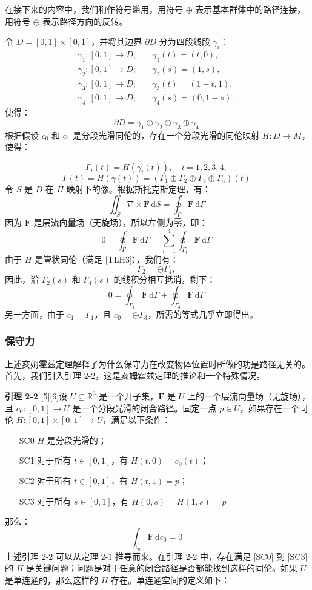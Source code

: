在接下来的内容中，我们稍作符号滥用，用符号 \(\oplus\) 表示基本群体中的路径连接，用符号 \(\ominus\) 表示路径方向的反转。

令 \(D = [0, 1] \times [0, 1]\)，并将其边界 \(\partial D\) 分为四段线段 \(\gamma_i\)：
\[
\begin{aligned}
\gamma_1: [0, 1] \to D; &\quad \gamma_1(t) = (t, 0), \\
\gamma_2: [0, 1] \to D; &\quad \gamma_2(s) = (1, s), \\
\gamma_3: [0, 1] \to D; &\quad \gamma_3(t) = (1 - t, 1), \\
\gamma_4: [0, 1] \to D; &\quad \gamma_4(s) = (0, 1 - s),
\end{aligned}~
\]
使得：
\[
\partial D = \gamma_1 \oplus \gamma_2 \oplus \gamma_3 \oplus \gamma_4~
\]
根据假设 \(c_0\) 和 \(c_1\) 是分段光滑同伦的，存在一个分段光滑的同伦映射 \(H: D \to M\)，使得：

\[
\Gamma_i(t) = H(\gamma_i(t)), \quad i = 1, 2, 3, 4,~
\]
\[
\Gamma(t) = H(\gamma(t)) = (\Gamma_1 \oplus \Gamma_2 \oplus \Gamma_3 \oplus \Gamma_4)(t)~
\]
令 \(S\) 是 \(D\) 在 \(H\) 映射下的像。根据斯托克斯定理，有：
\[
\iint_S \nabla \times \mathbf{F} \, \mathrm{d}S = \oint_\Gamma \mathbf{F} \, \mathrm{d}\Gamma~
\]
因为 \(\mathbf{F}\) 是层流向量场（无旋场），所以左侧为零，即：
\[
0 = \oint_\Gamma \mathbf{F} \, \mathrm{d}\Gamma = \sum_{i=1}^{4} \oint_{\Gamma_i} \mathbf{F} \, \mathrm{d}\Gamma~
\]
由于 \(H\) 是管状同伦（满足 [TLH3]），我们有：
\[
\Gamma_2 = \ominus \Gamma_4,~
\]
因此，沿 \(\Gamma_2(s)\) 和 \(\Gamma_4(s)\) 的线积分相互抵消，剩下：
\[
0 = \oint_{\Gamma_1} \mathbf{F} \, \mathrm{d}\Gamma + \oint_{\Gamma_3} \mathbf{F} \, \mathrm{d}\Gamma~
\]
另一方面，由于 \(c_1 = \Gamma_1\)，且 \(c_0 = \ominus \Gamma_3\)，所需的等式几乎立即得出。
\subsubsection{保守力}
上述亥姆霍兹定理解释了为什么保守力在改变物体位置时所做的功是路径无关的。首先，我们引入引理 2-2，这是亥姆霍兹定理的推论和一个特殊情况。

\textbf{引理 2-2} [5][6]设 \(U \subseteq \mathbb{R}^3\) 是一个开子集，\(\mathbf{F}\) 是 \(U\) 上的一个层流向量场（无旋场），且 \(c_0: [0, 1] \to U\) 是一个分段光滑的闭合路径。固定一点 \(p \in U\)，如果存在一个同伦 \(H: [0, 1] \times [0, 1] \to U\)，满足以下条件：

\begin{itemize}
\item [SC0] \(H\) 是分段光滑的；
\item [SC1] 对于所有 \(t \in [0, 1]\)，有 \(H(t, 0) = c_0(t)\)；
\item [SC2] 对于所有 \(t \in [0, 1]\)，有 \(H(t, 1) = p\)；
\item [SC3] 对于所有 \(s \in [0, 1]\)，有 \(H(0, s) = H(1, s) = p\)
\end{itemize}
那么：
\[
\int_{c_0} \mathbf{F} \, \mathrm{d}c_0 = 0~
\]
上述引理 2-2 可以从定理 2-1 推导而来。在引理 2-2 中，存在满足 [SC0] 到 [SC3] 的 \(H\) 是关键问题；问题是对于任意的闭合路径是否都能找到这样的同伦。如果 \(U\) 是单连通的，那么这样的 \(H\) 存在。单连通空间的定义如下：